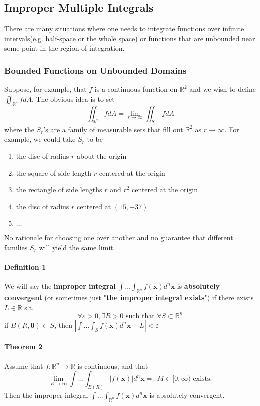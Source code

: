 \documentclass[11pt]{article}
\newcommand{\tb}[1]{\textbf{#1}}
\newcommand{\real}[0]{\mathbb{R}}
\newcommand{\vx}[0]{\tb{x}}
\newcommand{\vo}[0]{\tb{0}}
\begin{document}
\subsection{Improper Multiple Integrals}
There are many situations where one needs to integrate functions over infinite intervals(e.g. half-space or the whole space) or functions that are unbounded near some point in the region of integration. 
\subsubsection{Bounded Functions on Unbounded Domains}
Suppose, for example, that $f$ is a continuous function on $\real^2$ and we wish to define $\iint_{\real^2}fdA$. The obvious idea is to set $$\iint_{\real^2} fdA = \underset{r\rightarrow\infty}{\lim} \iint_{S_r}fdA$$ where the $S_r$'s are a family of measurable sets that fill out $\real^2$ as $r \rightarrow \infty$. For example, we could take $S_r$ to be 
\begin{enumerate}
    \item the disc of radius $r$ about the origin
    \item the square of side length $r$ centered at the origin
    \item the rectangle of side lengths $r$ and $r^2$ centered at the origin
    \item the disc of radius $r$ centered at $(15, -37)$
    \item $\hdots$
\end{enumerate}
No rationale for choosing one over another and no guarantee that different families $S_r$ will yield the same limit.
\paragraph{Definition 1} We will say the \tb{improper integral} $\int \hdots \int_{\real^n} f(\vx)d^n\vx$ is \tb{absolutely convergent} (or sometimes just "\tb{the improper integral exists}") if there exists $L \in \real$ s.t.
$$\forall \varepsilon >0, \exists R > 0 \mbox{ such that } \forall S \subset \real^n$$
if $B(R, \vo) \subset S$, then $|\int \hdots \int_S f(\vx) d^n\vx - L| < \varepsilon$

\paragraph{Theorem 2} Assume that $f: \real^n \rightarrow \real$ is continuous, and that
$$\underset{R \rightarrow \infty}{\lim} \int \hdots \int_{B(R)} |f(\vx)|d^n\vx =: M \in [0, \infty) \mbox{ exists.}$$
Then the improper integral $\int \hdots \int_{\real^n}f(\vx)d^n\vx$ is absolutely convergent.
\end{document}

